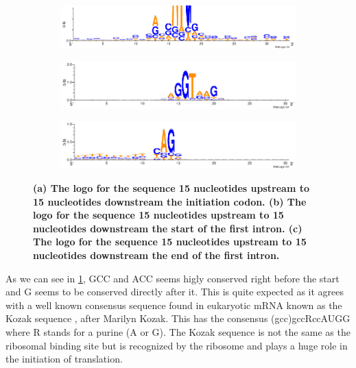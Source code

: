 \documentclass[10pt,letterpaper]{article}
\begin{document}
\begin{figure}[h]
\begin{subfigure}{.5\textwidth}
  \centering
  \includegraphics[width=5in]{../../results/2016-01-04/coding_sequences_logo.png}
  \caption{}
  \label{fig:sfig1}
\end{subfigure}%

\begin{subfigure}{.5\textwidth}
  \centering
  \includegraphics[width=5in]{../../results/2016-01-04/usg_intr_1_us_15.png}
  \caption{}
  \label{fig:sfig2}
\end{subfigure}

\begin{subfigure}{.5\textwidth}
  \centering
  \includegraphics[width=5in]{../../results/2016-01-04/usg_intr_1_ds_15.png}
  \caption{}
  \label{fig:sfig2}
\end{subfigure}
\caption{\bf (a) The logo for the sequence 15 nucleotides upstream to 15 nucleotides downstream the initiation codon. (b) The logo for the sequence 15 nucleotides upstream to 15 nucleotides downstream the start of the first intron. (c) The logo for the sequence 15 nucleotides upstream to 15 nucleotides downstream the end of the first intron.}
\label{fig2}
\end{figure}

As we can see in \ref{fig:sfig1}, GCC and ACC seems higly conserved right before the start and G seems to be conserved directly after it. This is quite expected as it agrees with a well known consensus sequence found in eukaryotic mRNA known as the Kozak sequence \cite{bib10}, after Marilyn Kozak. This has the consensus (gcc)gccRccAUGG where R stands for a purine (A or G). The Kozak sequence is not the same as the ribosomal binding site but is recognized by the ribosome and plays a huge role in the initiation of translation.
\end{document}
